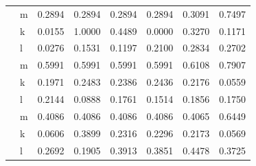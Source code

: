 \documentclass[
  12pt]{article}
\theoremstyle{definition}
\theoremstyle{remark}
\begin{document}
\begin{table}
{\begin{tabular}[t]{l|l|r|r|r|r|r|r}
\cline{1-8}
 & m & 0.2894 & 0.2894 & 0.2894 & 0.2894 & 0.3091 & 0.7497\\
\cline{2-8}
 & k & 0.0155 & 1.0000 & 0.4489 & 0.0000 & 0.3270 & 0.1171\\
\cline{2-8}
\multirow[t]{-3}{*}{\raggedright\arraybackslash 313} & l & 0.0276 & 0.1531 & 0.1197 & 0.2100 & 0.2834 & 0.2702\\
\cline{1-8}
 & m & 0.5991 & 0.5991 & 0.5991 & 0.5991 & 0.6108 & 0.7907\\
\cline{2-8}
 & k & 0.1971 & 0.2483 & 0.2386 & 0.2436 & 0.2176 & 0.0559\\
\cline{2-8}
\multirow[t]{-3}{*}{\raggedright\arraybackslash 311} & l & 0.2144 & 0.0888 & 0.1761 & 0.1514 & 0.1856 & 0.1750\\
\cline{1-8}
 & m & 0.4086 & 0.4086 & 0.4086 & 0.4086 & 0.4065 & 0.6449\\
\cline{2-8}
 & k & 0.0606 & 0.3899 & 0.2316 & 0.2296 & 0.2173 & 0.0569\\
\cline{2-8}
\multirow[t]{-3}{*}{\raggedright\arraybackslash 381} & l & 0.2692 & 0.1905 & 0.3913 & 0.3851 & 0.4478 & 0.3725\\
\hline
\end{tabular}

}

\end{table}%
\end{document}
